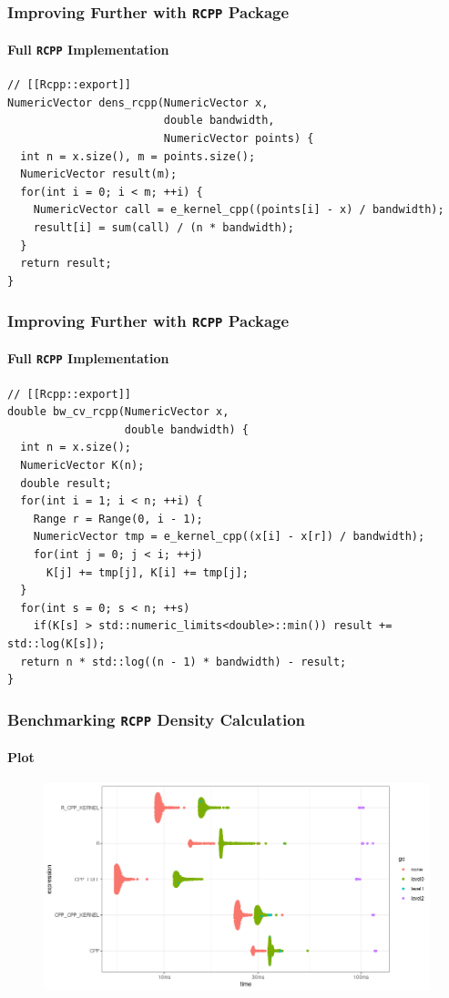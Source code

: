 \documentclass[aspectratio=169]{beamer}
\begin{document}
\begin{frame}[fragile]
  \frametitle{Improving Further with \texttt{RCPP} Package}
  \framesubtitle{Full \texttt{RCPP} Implementation}  
\begin{verbatim}
// [[Rcpp::export]]
NumericVector dens_rcpp(NumericVector x,
                        double bandwidth,
                        NumericVector points) {
  int n = x.size(), m = points.size();
  NumericVector result(m);
  for(int i = 0; i < m; ++i) {
    NumericVector call = e_kernel_cpp((points[i] - x) / bandwidth);
    result[i] = sum(call) / (n * bandwidth);
  }
  return result;
}
\end{verbatim}
\end{frame}
\begin{frame}[fragile]
  \frametitle{Improving Further with \texttt{RCPP} Package}
  \framesubtitle{Full \texttt{RCPP} Implementation}
\begin{verbatim}
// [[Rcpp::export]]
double bw_cv_rcpp(NumericVector x,
                  double bandwidth) {
  int n = x.size();
  NumericVector K(n);
  double result;
  for(int i = 1; i < n; ++i) {
    Range r = Range(0, i - 1);
    NumericVector tmp = e_kernel_cpp((x[i] - x[r]) / bandwidth);
    for(int j = 0; j < i; ++j)
      K[j] += tmp[j], K[i] += tmp[j];
  }
  for(int s = 0; s < n; ++s)
    if(K[s] > std::numeric_limits<double>::min()) result += std::log(K[s]);
  return n * std::log((n - 1) * bandwidth) - result;
}
\end{verbatim}
\end{frame}
\begin{frame}
  \frametitle{Benchmarking \texttt{RCPP} Density Calculation}
  \framesubtitle{Plot}
  \begin{figure}
    \centering
    \includegraphics[scale = 0.5]{figure/RcppVsRDens.png}  
  \end{figure}
\end{frame}
\end{document}
